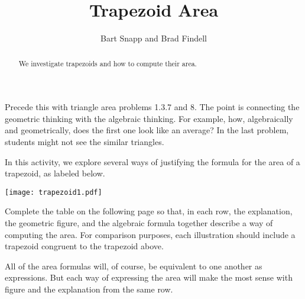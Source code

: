 \documentclass[nooutcomes]{ximera}
\title{Trapezoid Area}
\author{Bart Snapp and Brad Findell}
\begin{document}
\begin{abstract}
  We investigate trapezoids and how to compute their area.
\end{abstract}
\maketitle


\begin{teachingnote}
Precede this with triangle area problems 1.3.7 and 8.  The point is connecting the geometric thinking with the algebraic thinking.  For example, how, algebraically and geometrically, does the first one look like an average?  In the last problem, students might not see the similar triangles.
\end{teachingnote}

\begin{problem}
In this activity, we explore several ways of justifying the formula for the area of a trapezoid, as labeled below. 
\begin{image}
\texttt{[image: trapezoid1.pdf]}
\end{image}
Complete the table on the following page so that, in each row, the explanation, the geometric figure, and the algebraic formula together describe a way of computing the area.  For comparison purposes, each illustration should include a trapezoid congruent to the trapezoid above.   

All of the area formulas will, of course, be equivalent to one another as expressions.  But each way of expressing the area will make the most sense with figure and the explanation from the same row.  


\newpage

\newlength{\formulawidth}

\end{problem}
\end{document}
